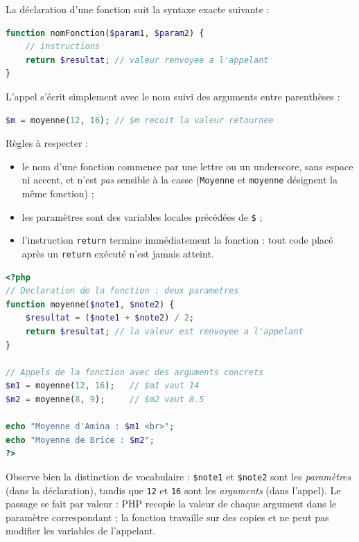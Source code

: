 \documentclass[11pt]{article}
\newcommand{\cle}[1]{{\popxbold\color{popdark}#1}}
\begin{document}
\begin{propriete}
La déclaration d'une fonction suit la syntaxe exacte suivante :
\begin{lstlisting}[language=Php]
function nomFonction($param1, $param2) {
    // instructions
    return $resultat; // valeur renvoyee a l'appelant
}
\end{lstlisting}
L'appel s'écrit simplement avec le nom suivi des \cle{arguments} entre parenthèses :
\begin{lstlisting}[language=Php]
$m = moyenne(12, 16); // $m recoit la valeur retournee
\end{lstlisting}
Règles à respecter :
\begin{itemize}
    \item le nom d'une fonction commence par une lettre ou un underscore, sans espace ni accent, et n'est \emph{pas} sensible à la casse (\texttt{Moyenne} et \texttt{moyenne} désignent la même fonction) ;
    \item les paramètres sont des variables locales précédées de \texttt{\$} ;
    \item l'instruction \texttt{return} termine immédiatement la fonction : tout code placé après un \texttt{return} exécuté n'est jamais atteint.
\end{itemize}
\end{propriete}

\begin{exemplebox}
\begin{lstlisting}[language=Php]
<?php
// Declaration de la fonction : deux parametres
function moyenne($note1, $note2) {
    $resultat = ($note1 + $note2) / 2;
    return $resultat; // la valeur est renvoyee a l'appelant
}

// Appels de la fonction avec des arguments concrets
$m1 = moyenne(12, 16);   // $m1 vaut 14
$m2 = moyenne(8, 9);     // $m2 vaut 8.5

echo "Moyenne d'Amina : $m1 <br>";
echo "Moyenne de Brice : $m2";
?>
\end{lstlisting}
Observe bien la distinction de vocabulaire : \texttt{\$note1} et \texttt{\$note2} sont les \emph{paramètres} (dans la déclaration), tandis que \texttt{12} et \texttt{16} sont les \emph{arguments} (dans l'appel). Le passage se fait \cle{par valeur} : PHP recopie la valeur de chaque argument dans le paramètre correspondant ; la fonction travaille sur des copies et ne peut pas modifier les variables de l'appelant.
\end{exemplebox}
\end{document}
